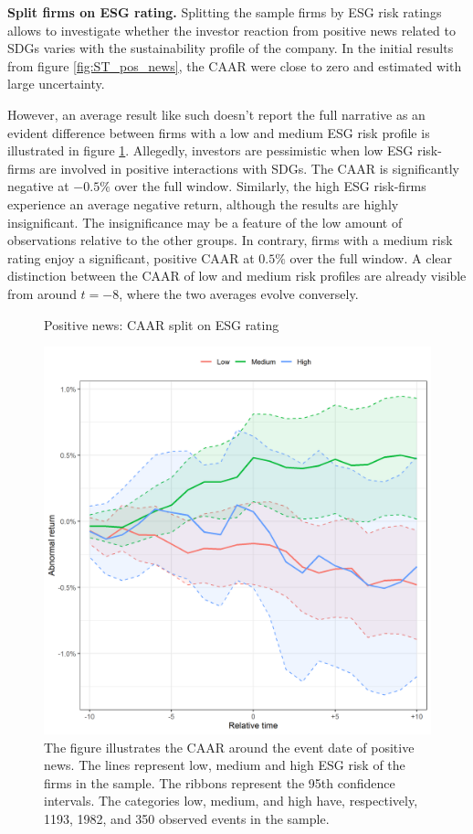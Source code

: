 \noindent \textbf{Split firms on ESG rating.}
Splitting the sample firms by ESG risk ratings allows to investigate whether the investor reaction from positive news related to SDGs varies with the sustainability profile of the company. In the initial results from figure \ref{fig:ST_pos_news}, the CAAR were close to zero and estimated with large uncertainty. 

However, an average result like such doesn't report the full narrative as an evident difference between firms with a low and medium ESG risk profile is illustrated in figure  \ref{fig:ST_pos_ESG}. Allegedly, investors are pessimistic when low ESG risk-firms are involved in positive interactions with SDGs. The CAAR is significantly negative at $-0.5\%$ over the full window. Similarly, the high ESG risk-firms experience an average negative return, although the results are highly insignificant. The insignificance may be a feature of the low amount of observations relative to the other groups. In contrary, firms with a medium risk rating enjoy a significant, positive CAAR at $0.5\%$ over the full window. A clear distinction between the CAAR of low and medium risk profiles are already visible from around $t = -8$, where the two averages evolve conversely. 


\begin{figure} [H]
    \centering
    \caption{Positive news: CAAR split on ESG rating}
    \includegraphics[scale=0.6]{Projekt/1.Figures analysis/ST_positive_ESG.png}
     \caption*{\footnotesize The figure illustrates the CAAR around the event date of positive news. The lines represent low, medium and high ESG risk of the firms in the sample. The ribbons represent the 95th confidence intervals. The categories low, medium, and high have, respectively, 1193, 1982, and 350 observed events in the sample.  }
    \label{fig:ST_pos_ESG}
\end{figure} 




